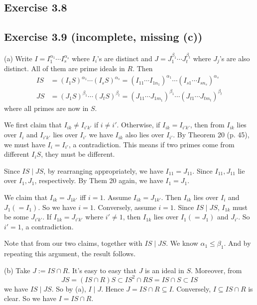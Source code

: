 \documentclass[../Marcus.tex]{subfiles}
\begin{document}
\subsection*{Exercise 3.8}

\subsection*{Exercise 3.9 \color{red}(incomplete, missing (c))}

(a) Write $I=I_1^{\alpha_1}\cdots I_s^{\alpha_s}$ where $I_i$'s are distinct and $J=J_1^{\beta_1}\cdots J_t^{\beta_t}$ where $J_j$'s are also distinct. All of them are prime ideals in $R$. Then
\begin{align*}
    IS &= (I_1S)^{\alpha_1}\cdots (I_sS)^{\alpha_s}=(I_{11}\cdots I_{1n_1})^{\alpha_1}\cdots (I_{s1}\cdots I_{sn_s})^{\alpha_s} \\
    JS &= (J_1S)^{\beta_1}\cdots (J_tS)^{\beta_t}=(J_{11}\cdots J_{1m_1})^{\beta_1}\cdots (J_{t1}\cdots J_{tm_t})^{\beta_t}
\end{align*}
where all primes are now in $S$.

We first claim that $I_{ik}\neq I_{i'k'}$ if $i\neq i'$. Otherwise, if $I_{ik}=I_{i'k'}$, then from $I_{ik}$ lies over $I_i$ and $I_{i'k'}$ lies over $I_{i'}$ we have $I_{ik}$ also lies over $I_{i'}$. By Theorem 20 (p. 45), we must have $I_i=I_{i'}$, a contradiction. This means if two primes come from different $I_iS$, they must be different.

Since $IS\mid JS$, by rearranging appropriately, we have $I_{11}=J_{11}$. Since $I_{11},J_{11}$ lie over $I_1,J_1$, respectively. By Them 20 again, we have $I_1=J_1$.

We claim that $I_{ik}=J_{1k'}$ iff $i=1$. Assume $I_{ik}=J_{1k'}$. Then $I_{ik}$ lies over $I_i$ and $J_1(=I_1)$. So we have $i=1$. Conversely, assume $i=1$. Since $IS\mid JS$, $I_{1k}$ must be some $J_{i'k'}$. If $I_{1k}=J_{i'k'}$ where $i'\neq 1$, then $I_{1k}$ lies over $I_1(=J_1)$ and $J_{i'}$. So $i'=1$, a contradiction.

Note that from our two claims, together with $IS\mid JS$. We know $\alpha_1\leq \beta_1$. And by repeating this argument, the result follows.

(b) Take $J:=IS\cap R$. It's easy to easy that $J$ is an ideal in $S$. Moreover, from $$JS=(IS\cap R)S\subset IS^2\cap RS=IS\cap S\subset IS$$ we have $IS\mid JS$. So by (a), $I\mid J$. Hence $J=IS\cap R\subseteq I$. Conversely, $I\subseteq IS\cap R$ is clear. So we have $I=IS\cap R$.
\end{document}
